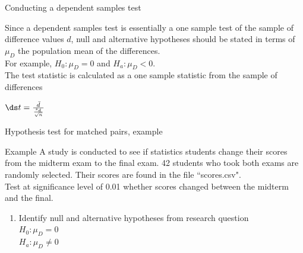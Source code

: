 \documentclass[xcolor=table, aspectratio=169, bigger, handout]{beamer}
\begin{document}
\begin{frame}{Conducting a dependent samples test}
\begin{block}{}
Since a dependent samples test is essentially a one sample test of the sample of difference values $d$, null and alternative hypotheses should be stated in terms of $\mu_D$ the population mean of the differences.\\
\pause\medskip
For example, $H_0: \mu_D = 0$ and $H_a: \mu_D < 0$.\\
\pause\medskip
The test statistic is calculated as a one sample statistic from the sample of differences\\
\medskip
{\centering $\ds t = \frac {\bar d}{\frac{s_d}{\sqrt{n}}}$ \par}
\medskip
\end{block}
\end{frame}



\begin{frame}{Hypothesis test for matched pairs, example}
\begin{exampleblock}{Example}
A study is conducted to see if statistics students change their scores from the midterm exam to the final exam. 42 students who took both exams are randomly selected. Their scores are found in the file ``scores.csv".\\
\medskip
Test at significance level of 0.01 whether scores changed between the midterm and the final.
\begin{enumerate}
\pause\item Identify null and alternative hypotheses from research question\\
\pause$H_0: \mu_D = 0$\\
$H_a: \mu_D \ne 0$\\
\end{enumerate}
\end{exampleblock}
\end{frame}
\end{document}
